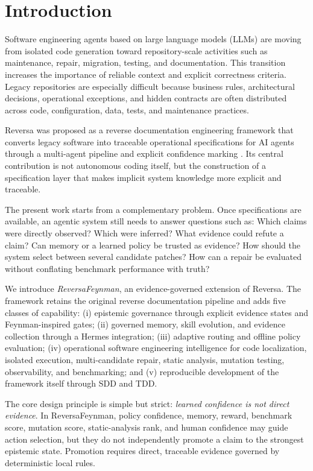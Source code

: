 \section{Introduction}

Software engineering agents based on large language models (LLMs) are moving from isolated code generation toward repository-scale activities such as maintenance, repair, migration, testing, and documentation. This transition increases the importance of reliable context and explicit correctness criteria. Legacy repositories are especially difficult because business rules, architectural decisions, operational exceptions, and hidden contracts are often distributed across code, configuration, data, tests, and maintenance practices.

Reversa was proposed as a reverse documentation engineering framework that converts legacy software into traceable operational specifications for AI agents through a multi-agent pipeline and explicit confidence marking \cite{macedo2026reversa}. Its central contribution is not autonomous coding itself, but the construction of a specification layer that makes implicit system knowledge more explicit and traceable.

The present work starts from a complementary problem. Once specifications are available, an agentic system still needs to answer questions such as: Which claims were directly observed? Which were inferred? What evidence could refute a claim? Can memory or a learned policy be trusted as evidence? How should the system select between several candidate patches? How can a repair be evaluated without conflating benchmark performance with truth?

We introduce \emph{ReversaFeynman}, an evidence-governed extension of Reversa. The framework retains the original reverse documentation pipeline and adds five classes of capability: (i) epistemic governance through explicit evidence states and Feynman-inspired gates; (ii) governed memory, skill evolution, and evidence collection through a Hermes integration; (iii) adaptive routing and offline policy evaluation; (iv) operational software engineering intelligence for code localization, isolated execution, multi-candidate repair, static analysis, mutation testing, observability, and benchmarking; and (v) reproducible development of the framework itself through SDD and TDD.

The core design principle is simple but strict: \emph{learned confidence is not direct evidence}. In ReversaFeynman, policy confidence, memory, reward, benchmark score, mutation score, static-analysis rank, and human confidence may guide action selection, but they do not independently promote a claim to the strongest epistemic state. Promotion requires direct, traceable evidence governed by deterministic local rules.

